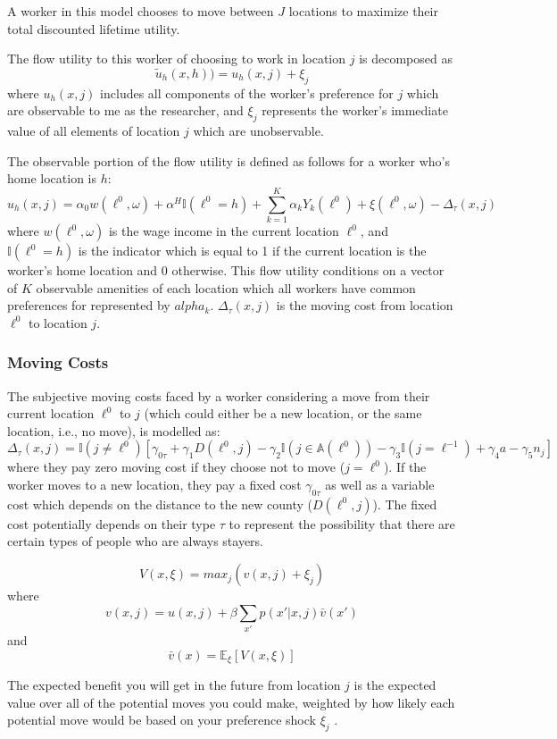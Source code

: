A worker in this model chooses to move between $J$ locations to maximize their total discounted lifetime utility.

The flow utility to this worker of choosing to work in location $j$ is decomposed as
$$\tilde{u}_h(x,h))=u_h(x,j) + \xi_j$$
where $u_h(x,j)$ includes all components of the worker's preference for $j$ which are observable to me as the researcher,
and $\xi_j$ represents the worker's immediate value of all elements of location $j$ which are unobservable.

The observable portion of the flow utility is defined as follows for a worker who's home location is $h$:
\begin{equation}
u_h(x,j) = \alpha_0 w(\ell^0,\omega) + \alpha^H \mathbb{I}(\ell^0=h) + \sum_{k=1}^{K}\alpha_kY_k(\ell^0)
+ \xi(\ell^0,\omega) - \Delta_\tau(x,j)
\end{equation}
where
$w(\ell^0,\omega)$ is the wage income in the current location $\ell^0$,
and $\mathbb{I}(\ell^0=h)$ is the indicator which is equal to 1 if the current location is the worker's home location and 0 otherwise.
This flow utility conditions on a vector of $K$ observable amenities of each location 
which all workers have common preferences for represented by $alpha_k$.
$\Delta_\tau(x,j)$ is the moving cost from location $\ell^0$ to location $j$.

\subsubsection{Moving Costs}

The subjective moving costs faced by a worker considering a move from their current location $\ell^0$ to $j$
(which could either be a new location, or the same location, i.e., no move),
is modelled as:
\begin{equation}
  \Delta_\tau(x,j) = \mathbb{I}(j\neq\ell^0) 
  \left[ 
    \gamma_{0\tau} + \gamma_1 D(\ell^0, j) - \gamma_2 \mathbb{I}(j\in\mathbb{A}(\ell^0))
    - \gamma_3 \mathbb{I}(j=\ell^{-1}) + \gamma_4a - \gamma_5 n_j
  \right]
\end{equation}
where they pay zero moving cost if they choose not to move ($j=\ell^0$).
If the worker moves to a new location, they pay a fixed cost $\gamma_{0\tau}$ 
as well as a variable cost which depends on the distance to the new county ($D(\ell^0, j)$).
The fixed cost potentially depends on their type $\tau$ to represent the possibility that there are certain types of people who are always stayers.


\begin{equation}
V(x,\xi) = max_j(v(x,j)+\xi_j)
\end{equation}
where
\begin{equation}
v(x,j) = u(x,j) + \beta \sum_{x'}p(x' | x,j) \bar{v}(x')
\end{equation}
and
\begin{equation}
\bar{v}(x) = \mathbb{E}_{\xi} [V(x,\xi)]
\end{equation}

The expected benefit you will get in the future from location $j$ is the expected value over all of the potential moves you could make, weighted by how likely each potential move would be based on your preference shock $\xi_j$ .